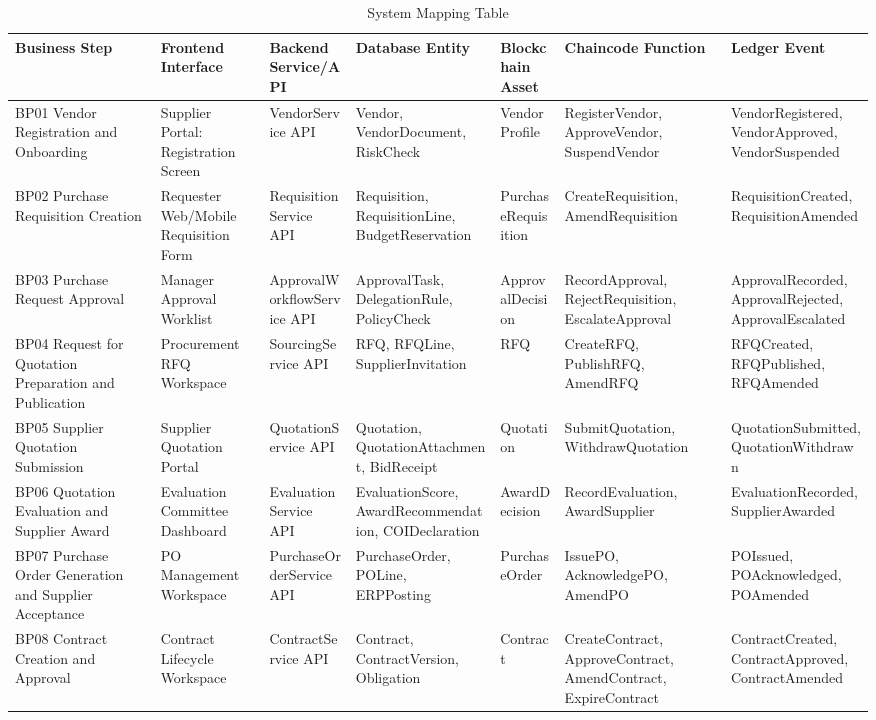 \documentclass[conference]{IEEEtran}
\begin{document}
\begin{table}[t]
\caption{System Mapping Table}
\label{tab:systemmapping}
\tiny
\begin{tabularx}{\textwidth}{|L{2.2cm}|L{2.1cm}|L{2.1cm}|Y|L{1.6cm}|L{2.3cm}|L{2.3cm}|}
\hline
\textbf{Business Step} & \textbf{Frontend Interface} & \textbf{Backend Service/API} & \textbf{Database Entity} & \textbf{Blockchain Asset} & \textbf{Chaincode Function} & \textbf{Ledger Event} \\ \hline
BP01 Vendor Registration and Onboarding & Supplier Portal: Registration Screen & VendorService API & Vendor, VendorDocument, RiskCheck & VendorProfile & RegisterVendor, ApproveVendor, SuspendVendor & VendorRegistered, VendorApproved, VendorSuspended \\ \hline
BP02 Purchase Requisition Creation & Requester Web/Mobile Requisition Form & RequisitionService API & Requisition, RequisitionLine, BudgetReservation & PurchaseRequisition & CreateRequisition, AmendRequisition & RequisitionCreated, RequisitionAmended \\ \hline
BP03 Purchase Request Approval & Manager Approval Worklist & ApprovalWorkflowService API & ApprovalTask, DelegationRule, PolicyCheck & ApprovalDecision & RecordApproval, RejectRequisition, EscalateApproval & ApprovalRecorded, ApprovalRejected, ApprovalEscalated \\ \hline
BP04 Request for Quotation Preparation and Publication & Procurement RFQ Workspace & SourcingService API & RFQ, RFQLine, SupplierInvitation & RFQ & CreateRFQ, PublishRFQ, AmendRFQ & RFQCreated, RFQPublished, RFQAmended \\ \hline
BP05 Supplier Quotation Submission & Supplier Quotation Portal & QuotationService API & Quotation, QuotationAttachment, BidReceipt & Quotation & SubmitQuotation, WithdrawQuotation & QuotationSubmitted, QuotationWithdrawn \\ \hline
BP06 Quotation Evaluation and Supplier Award & Evaluation Committee Dashboard & EvaluationService API & EvaluationScore, AwardRecommendation, COIDeclaration & AwardDecision & RecordEvaluation, AwardSupplier & EvaluationRecorded, SupplierAwarded \\ \hline
BP07 Purchase Order Generation and Supplier Acceptance & PO Management Workspace & PurchaseOrderService API & PurchaseOrder, POLine, ERPPosting & PurchaseOrder & IssuePO, AcknowledgePO, AmendPO & POIssued, POAcknowledged, POAmended \\ \hline
BP08 Contract Creation and Approval & Contract Lifecycle Workspace & ContractService API & Contract, ContractVersion, Obligation & Contract & CreateContract, ApproveContract, AmendContract, ExpireContract & ContractCreated, ContractApproved, ContractAmended \\ \hline

\end{tabularx}
\end{table}
\end{document}
